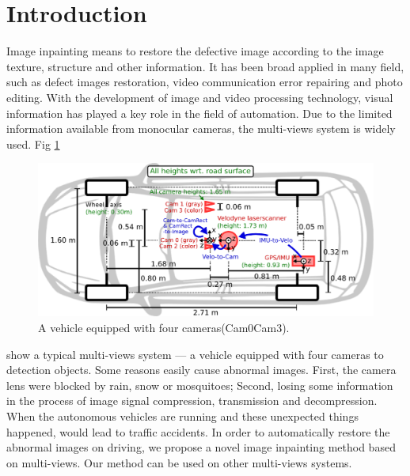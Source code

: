 \documentclass{IEEE_lsens}
\begin{document}
\maketitle

\section{Introduction}

Image inpainting means to restore the defective image according to the image texture, structure and other information. It has been broad applied in many field, such as defect images restoration\cite{Efros1999::Texture,Lu2010::Novel}, video communication error repairing\cite{Rane2002::Wavelet,Rane2003:IToIP:Structure} and photo editing\cite{Bertalmio2000::Image,Shih2005::Digital}. With the development of image and video processing technology, visual information has played a key role in the field  of automation. Due to the limited information available from monocular cameras, the multi-views system is widely used. Fig \ref{fig:VehicleWithFourCameras} 
\begin{figure}[!t]
\centering
\includegraphics[width=6.0in]{self_driver_top_view}
\caption{A vehicle equipped with four cameras(Cam0\texttildelow Cam3).}
\label{fig:VehicleWithFourCameras}
\end{figure}
show a typical multi-views system --- a vehicle equipped with four cameras to detection objects\cite{Geiger2012::Are}. Some reasons easily cause abnormal images. First, the camera lens were blocked by rain, snow or mosquitoes; Second, losing some information in the process of image signal compression, transmission and decompression. When the autonomous vehicles are running and these unexpected things happened, would lead to traffic accidents. In order to automatically restore the abnormal images on driving, we propose a novel image inpainting method based on multi-views. Our method can be used on other multi-views systems.
\end{document}
